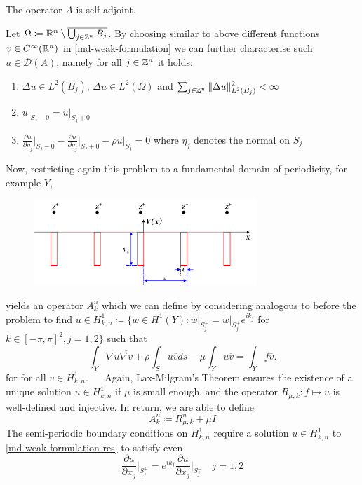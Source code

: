 \begin{remark}
	The operator $A$ is self-adjoint.	
\end{remark}


\begin{theorem} Let $\Omega \coloneqq \mathbb{R}^{n} \setminus \overline{\bigcup_{j \in \mathbb{Z}^{n}} B_{j}}$. By choosing similar to above different functions $v \in C^{\infty}(\mathbb{R}^{n})$ in \eqref{md-weak-formulation} we can further characterise such $u \in \mathcal{D}(A)$, namely for all $j \in \mathbb{Z}^{n}$ it holds:
	\begin{enumerate}
		\item $\Delta u \in L^{2}(B_{j})$, $\Delta u \in L^{2}(\Omega)$ and $\sum_{j \in \mathbb{Z}^{n}} \|\Delta u \|_{L^{2}(B_{j})}^{2} < \infty$
		\item $u \big|_{S_{j} - 0} = u \big|_{S_{j} + 0}$
		\item $\frac{\partial u}{\partial \eta_{j}} \big|_{S_{j} - 0} - \frac{\partial u}{\partial \eta_{j}} \big|_{S_{j} + 0} - \rho u \big|_{S_{j}} = 0$ where $\eta_{j}$ denotes the normal on $S_{j}$
	\end{enumerate}
\end{theorem}

Now, restricting again this problem to a fundamental domain of periodicity, for example $Y$,
\begin{figure}[h!] \centering
	  \includegraphics[width=0.75\textwidth]{Periodic_square_potential_130707} 
\end{figure}

yields an operator $A^{n}_{k}$ which we can define by considering analogous to before the problem to find $u \in H^{1}_{k, n} \coloneqq \big\{ w \in H^{1}(Y) \colon w \big|_{S_{j}^{+}} = w \big|_{S_{j}^{+}} e^{i k_{j}}$ for $k \in [-\pi, \pi]^{2}, j = 1,2 \big\}$ such that
	\begin{equation}
		\int_{Y} \nabla u \overline{\nabla v} + \rho \int_{S} u \overline{v} ds - \mu \int_{Y} u \overline{v} = \int_{Y} f \overline{v}. \label{md-weak-formulation-res}
	\end{equation} 
for for all $v \in H^{1}_{k, n}$.
~\newline ~\newline
Again, Lax-Milgram's Theorem ensures the existence of a unique solution $u \in H^{1}_{k, n}$ if $\mu$ is small enough, and the operator $R_{\mu, k} \colon f \mapsto u$ is well-defined and injective. In return, we are able to define 
	\[ A_{k}^{n} \coloneqq R_{\mu, k}^{n} + \mu I \]
The semi-periodic boundary conditions on $H^{1}_{k,n}$ require a solution $u \in H^{1}_{k, n}$ to \eqref{md-weak-formulation-res} to satisfy even
	\[ \frac{\partial u}{\partial x_{j}}\big|_{S_{j}^{+}} = e^{ik_{j}} \frac{\partial u}{\partial x_{j}}\big|_{S_{j}^{-}} \quad j = 1,2  \]
	
